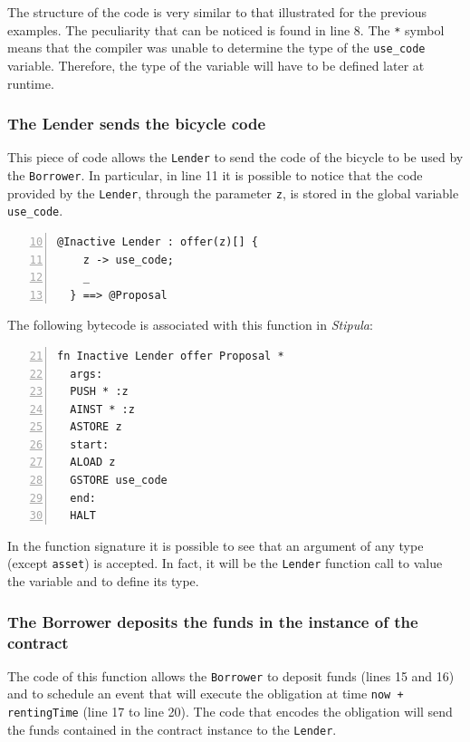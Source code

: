 The structure of the code is very similar to that illustrated for the previous examples. The peculiarity 
that can be noticed is found in line 8. The \verb|*| symbol means that the compiler was unable to 
determine the type of the \verb|use_code| variable. Therefore, the type of the variable will have to be 
defined later at runtime.

\subsubsection{The Lender sends the bicycle code}
\label{dynamic-type}

This piece of code allows the \verb|Lender| to send the code of the bicycle to be used by the 
\verb|Borrower|. In particular, in line 11 it is possible to notice that the code provided by the 
\verb|Lender|, through the parameter \verb|z|, is stored in the global variable \verb|use_code|.

\begin{Verbatim}[numbers=left,xleftmargin=1cm,firstnumber=10,tabsize=2]
  @Inactive Lender : offer(z)[] {
    z -> use_code;
    _
  } ==> @Proposal
\end{Verbatim}

\newpage
The following bytecode is associated with this function in \textit{Stipula}:

\begin{Verbatim}[numbers=left,xleftmargin=1cm,firstnumber=21,tabsize=2]
  fn Inactive Lender offer Proposal *
  args:
  PUSH * :z
  AINST * :z
  ASTORE z
  start:
  ALOAD z
  GSTORE use_code
  end:
  HALT
\end{Verbatim}

In the function signature it is possible to see that an argument of any type (except \verb|asset|) is 
accepted. In fact, it will be the \verb|Lender| function call to value the variable and to define its type.

\subsubsection{The Borrower deposits the funds in the instance of the contract}

The code of this function allows the \verb|Borrower| to deposit funds (lines 15 and 16) and to schedule an 
event that will execute the obligation at time \verb|now + rentingTime| (line 17 to line 20). The code 
that encodes the obligation will send the funds contained in the contract instance to the \verb|Lender|.

